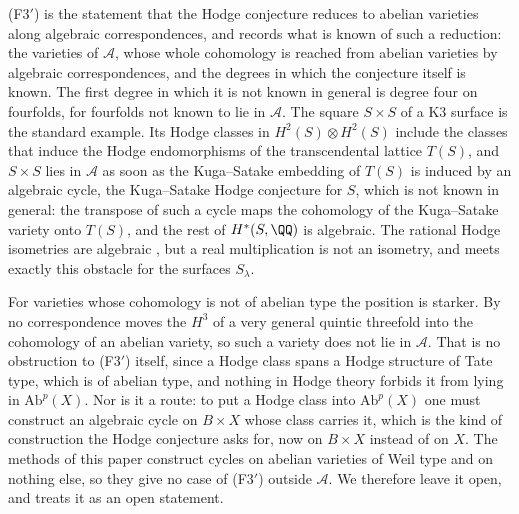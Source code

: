 \begin{remark}\label{rem:f3primeopen}
\textup{(F3$'$)} is the statement that the Hodge conjecture reduces to
abelian varieties along algebraic correspondences, and
 records what is known of such a reduction: the
varieties of $\mathcal{A}$, whose whole cohomology is reached from abelian
varieties by algebraic correspondences, and the degrees in which the
conjecture itself is known. The first degree in which it is not known in
general is degree four on fourfolds, for fourfolds not known to lie in
$\mathcal{A}$. The square $S\times S$ of a K3 surface is the standard
example. Its Hodge classes in $H^{2}(S)\otimes H^{2}(S)$ include the classes
that induce the Hodge endomorphisms of the transcendental lattice $T(S)$, and
$S\times S$ lies in $\mathcal{A}$ as soon as the Kuga--Satake embedding of
$T(S)$ is induced by an algebraic cycle, the Kuga--Satake Hodge conjecture for
$S$, which is not known in general: the transpose of such a cycle maps the
cohomology of the Kuga--Satake variety onto $T(S)$, and the rest of
$H^{*}(S,\QQ)$ is algebraic. The rational Hodge isometries are algebraic
\cite{Bus19}, but a real multiplication is not an isometry, and
 meets exactly this obstacle for the surfaces
$S_{\lambda}$.

For varieties whose cohomology is not of abelian type the position is
starker. By  no correspondence moves the $H^{3}$ of a
very general quintic threefold into the cohomology of an abelian variety, so
such a variety does not lie in $\mathcal{A}$. That is no obstruction to
\textup{(F3$'$)} itself, since a Hodge class spans a Hodge structure of Tate
type, which is of abelian type, and nothing in Hodge theory forbids it from
lying in $\mathrm{Ab}^{p}(X)$. Nor is it a route: to put a Hodge class into
$\mathrm{Ab}^{p}(X)$ one must construct an algebraic cycle on $B\times X$
whose class carries it, which is the kind of construction the Hodge
conjecture asks for, now on $B\times X$ instead of on $X$. The methods of
this paper construct cycles on abelian varieties of Weil type and on nothing
else, so they give no case of \textup{(F3$'$)} outside $\mathcal{A}$. We
therefore leave it open, and  treats it as an open
statement.
\end{remark}

